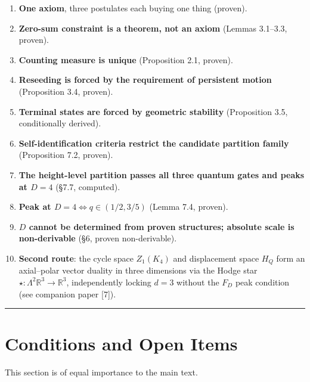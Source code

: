\documentclass[
  11pt,
]{article}
\providecommand{\tightlist}{%
  \setlength{\itemsep}{0pt}\setlength{\parskip}{0pt}}
\begin{document}
\begin{enumerate}
\def\labelenumi{\arabic{enumi}.}
\tightlist
\item
  \textbf{One axiom}, three postulates each buying one thing (proven).
\item
  \textbf{Zero-sum constraint is a theorem, not an axiom} (Lemmas
  3.1--3.3, proven).
\item
  \textbf{Counting measure is unique} (Proposition 2.1, proven).
\item
  \textbf{Reseeding is forced by the requirement of persistent motion}
  (Proposition 3.4, proven).
\item
  \textbf{Terminal states are forced by geometric stability}
  (Proposition 3.5, conditionally derived).
\item
  \textbf{Self-identification criteria restrict the candidate partition
  family} (Proposition 7.2, proven).
\item
  \textbf{The height-level partition passes all three quantum gates and
  peaks at \(D=4\)} (§7.7, computed).
\item
  \textbf{Peak at \(D=4\iff q\in(1/2,3/5)\)} (Lemma 7.4, proven).
\item
  \textbf{\(D\) cannot be determined from proven structures; absolute
  scale is non-derivable} (§6, proven non-derivable).
\item
  \textbf{Second route}: the cycle space \(Z_1(K_4)\) and displacement
  space \(H_Q\) form an axial--polar vector duality in three dimensions
  via the Hodge star \(\star:\Lambda^2\mathbb R^3\to\mathbb R^3\),
  independently locking \(d=3\) without the \(F_D\) peak condition (see
  companion paper {[}7{]}).
\end{enumerate}

\begin{center}\rule{0.5\linewidth}{0.5pt}\end{center}

\section{Conditions and Open
Items}\label{conditions-and-open-items}

This section is of equal importance to the main text.
\end{document}
